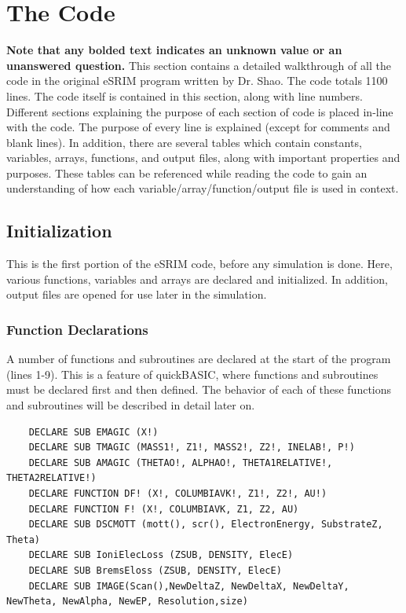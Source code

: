 \documentclass[10pt, reqno]{exam}
\begin{document}
\section{The Code}
\textbf{Note that any bolded text indicates an unknown value or an unanswered question.} This section contains a detailed walkthrough of all the code in the original eSRIM program written by Dr. Shao. The code totals 1100 lines. The code itself is contained in this section, along with line numbers. Different sections explaining the purpose of each section of code is placed in-line with the code. The purpose of every line is explained (except for comments and blank lines). In addition, there are several tables which contain constants, variables, arrays, functions, and output files, along with important properties and purposes. These tables can be referenced while reading the code to gain an understanding of how each variable/array/function/output file is used in context. \par

\subsection{Initialization}

This is the first portion of the eSRIM code, before any simulation is done. Here, various functions, variables and arrays are declared and initialized. In addition, output files are opened for use later in the simulation. \par

\subsubsection{Function Declarations}
\label{sec:function declarations}

A number of functions and subroutines are declared at the start of the program (lines 1-9). This is a feature of quickBASIC, where functions and subroutines must be declared first and then defined. The behavior of each of these functions and subroutines will be described in detail later on. \par

\begin{verbatim}
    DECLARE SUB EMAGIC (X!)
    DECLARE SUB TMAGIC (MASS1!, Z1!, MASS2!, Z2!, INELAB!, P!)
    DECLARE SUB AMAGIC (THETAO!, ALPHAO!, THETA1RELATIVE!, THETA2RELATIVE!)
    DECLARE FUNCTION DF! (X!, COLUMBIAVK!, Z1!, Z2!, AU!)
    DECLARE FUNCTION F! (X!, COLUMBIAVK, Z1, Z2, AU)
    DECLARE SUB DSCMOTT (mott(), scr(), ElectronEnergy, SubstrateZ, Theta)
    DECLARE SUB IoniElecLoss (ZSUB, DENSITY, ElecE)
    DECLARE SUB BremsEloss (ZSUB, DENSITY, ElecE)
    DECLARE SUB IMAGE(Scan(),NewDeltaZ, NewDeltaX, NewDeltaY, NewTheta, NewAlpha, NewEP, Resolution,size)
\end{verbatim}
\end{document}
